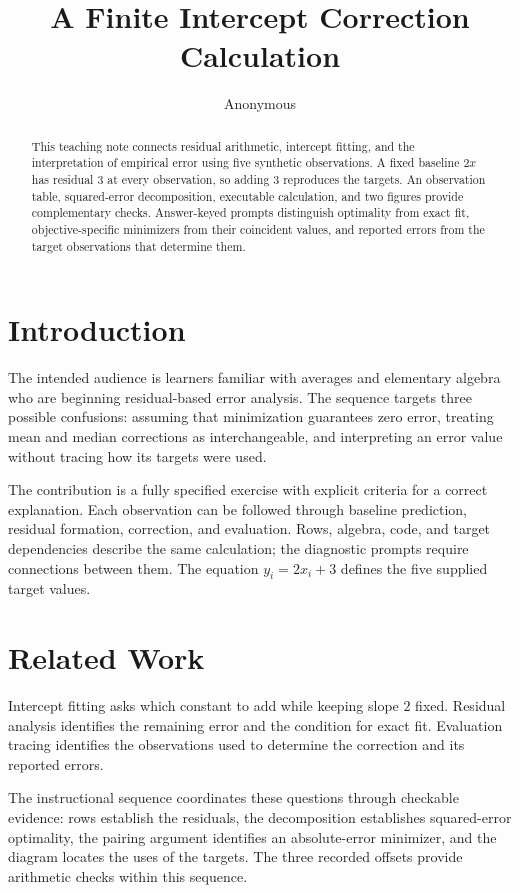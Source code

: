 \documentclass[11pt]{article}
\title{A Finite Intercept Correction Calculation}
\author{Anonymous}
\date{}
\begin{document}
\maketitle

\begin{abstract}
This teaching note connects residual arithmetic, intercept fitting, and the interpretation of empirical error using five synthetic observations. A fixed baseline \(2x\) has residual \(3\) at every observation, so adding \(3\) reproduces the targets. An observation table, squared-error decomposition, executable calculation, and two figures provide complementary checks. Answer-keyed prompts distinguish optimality from exact fit, objective-specific minimizers from their coincident values, and reported errors from the target observations that determine them.
\end{abstract}

\section{Introduction}

The intended audience is learners familiar with averages and elementary algebra who are beginning residual-based error analysis. The sequence targets three possible confusions: assuming that minimization guarantees zero error, treating mean and median corrections as interchangeable, and interpreting an error value without tracing how its targets were used.

The contribution is a fully specified exercise with explicit criteria for a correct explanation. Each observation can be followed through baseline prediction, residual formation, correction, and evaluation. Rows, algebra, code, and target dependencies describe the same calculation; the diagnostic prompts require connections between them. The equation \(y_i=2x_i+3\) defines the five supplied target values.

\section{Related Work}

Intercept fitting asks which constant to add while keeping slope \(2\) fixed. Residual analysis identifies the remaining error and the condition for exact fit. Evaluation tracing identifies the observations used to determine the correction and its reported errors.

The instructional sequence coordinates these questions through checkable evidence: rows establish the residuals, the decomposition establishes squared-error optimality, the pairing argument identifies an absolute-error minimizer, and the diagram locates the uses of the targets. The three recorded offsets provide arithmetic checks within this sequence.
\end{document}
